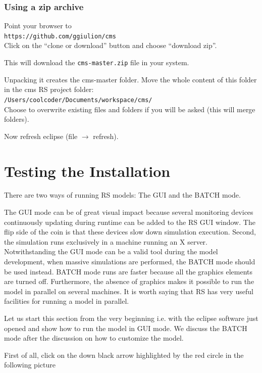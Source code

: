 \documentclass{article}
\begin{document}
\vskip2mm

\subsubsection{Using a zip archive}

Point your browser to\\ 
\verb+https://github.com/ggiulion/cms+\\
Click on the ``clone or download'' button and choose ``download zip''.

This will download the \verb+cms-master.zip+ file in your system.

Unpacking it creates the cms-master folder.
Move the whole content of this folder in the cms RS project folder:\\  
\verb+/Users/coolcoder/Documents/workspace/cms/+\\
Choose to overwrite existing files and folders if you will be asked (this will merge folders). 

Now refresh eclipse (file $\rightarrow$ refresh).



\section{Testing the Installation}


There are two ways of running RS models: The GUI and the BATCH mode.

The GUI mode can be of great visual impact because several monitoring devices continuously updating during runtime can be added to the RS GUI window. The flip side of the coin is that these devices slow down simulation execution. Second, the simulation runs exclusively in a machine running an X server. Notwithstanding the GUI mode can be a valid tool during the model development, when massive simulations are performed, the BATCH mode should be used instead. BATCH mode runs are faster because all the graphics elements are turned off. Furthermore, the absence of graphics makes it possible to run the model in parallel on several machines. It is worth saying that RS has very useful facilities for running a model in parallel.


Let us start this section from the very beginning i.e. with the eclipse software just opened and show how to run the model in GUI mode. 
We discuss the BATCH mode after the discussion on how to customize the model.

First of all, click on the down black arrow highlighted by the red circle in the following picture
\end{document}
